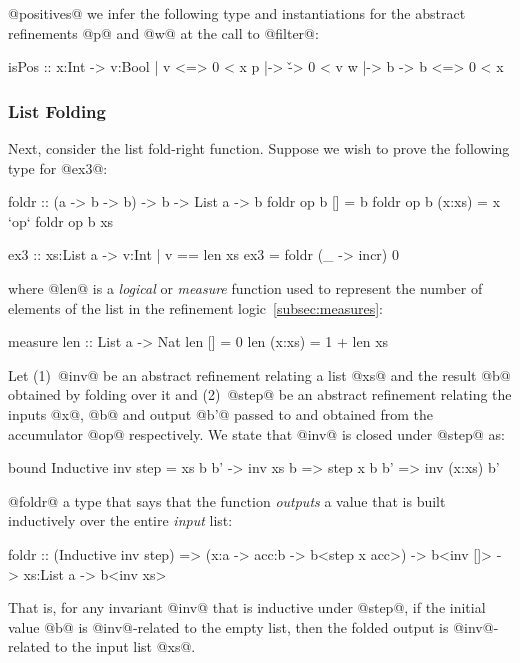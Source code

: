  @positives@ we infer the following type and
instantiations for the abstract refinements @p@ and @w@ at the
call to @filter@:
%
\begin{code}
  isPos :: x:Int -> {v:Bool | v <=> 0 < x}
  p     |-> \v    -> 0 < v
  w     |-> \x b  -> b <=> 0 < x
\end{code}

\subsubsection{List Folding}

Next, consider the list fold-right function. Suppose we
wish to prove the following type for @ex3@:
%
\begin{code}
  foldr :: (a -> b -> b) -> b -> List a -> b
  foldr op b []     = b
  foldr op b (x:xs) = x `op` foldr op b xs

  ex3 :: xs:List a -> {v:Int | v == len xs}
  ex3 = foldr (\_ -> incr) 0
\end{code}
%
where @len@ is a \emph{logical} or \emph{measure}
function used to represent the number of elements of
the list in the refinement logic~\ref{subsec:measures}:
%
\begin{code}
  measure len :: List a -> Nat
  len []      = 0
  len (x:xs)  = 1 + len xs
\end{code}

 Let
(1)~@inv@ be an abstract refinement relating a list @xs@
    and the result @b@ obtained by folding over it and
(2)~@step@ be an abstract refinement relating the
    inputs @x@, @b@ and output @b'@ passed to and
    obtained from the accumulator @op@ respectively.
%
We state that @inv@ is closed under @step@ as:
%
\begin{code}
  bound Inductive inv step = \x xs b b' ->
        inv xs b => step x b b' => inv (x:xs) b'
\end{code}
%

 @foldr@ a type that says that the
function \emph{outputs} a value that is built inductively
over the entire \emph{input} list:
%
\begin{code}
  foldr :: (Inductive inv step)
        => (x:a -> acc:b -> b<step x acc>)
        -> b<inv []>
        -> xs:List a
        -> b<inv xs>
\end{code}
%
That is, for any invariant @inv@ that is inductive
under @step@, if the initial value @b@ is @inv@-related
to the empty list, then the folded output is @inv@-related
to the input list @xs@.


